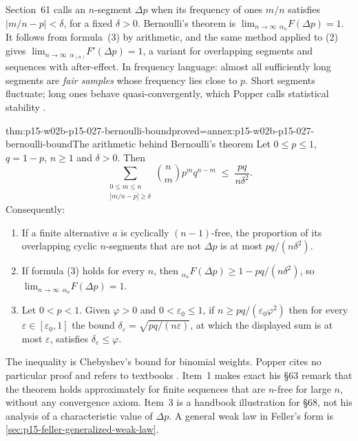 Section~61 calls an \(n\)-segment \(\Delta p\) when its frequency of
ones \(m/n\) satisfies \(|m/n-p|<\delta\), for a fixed \(\delta>0\).
Bernoulli's theorem is
\(\lim_{n\to\infty}{}_{\alpha_n}F(\Delta p)=1\). It follows from
formula~(3) by arithmetic, and the same method applied to (2) gives
\(\lim_{n\to\infty}{}_{\alpha_{(n)}}F'(\Delta p)=1\), a variant for
overlapping segments and sequences with after-effect. In frequency
language: almost all sufficiently long segments are \emph{fair samples}
whose frequency lies close to \(p\). Short segments fluctuate; long ones
behave quasi-convergently, which Popper calls statistical stability
\parencite[\S61]{Popper2002LogicDiscoveryUI}.

\begin{hbtheorem}{thm:p15-w02b-p15-027-bernoulli-bound}{proved=annex:p15-w02b-p15-027-bernoulli-bound}{The arithmetic behind Bernoulli's theorem}
Let \(0\leq p\leq1\), \(q=1-p\), \(n\geq1\) and \(\delta>0\). Then
\[
 \sum_{\substack{0\leq m\leq n\\ |m/n-p|\geq\delta}}\binom{n}{m}p^mq^{n-m}
 \;\leq\;\frac{pq}{n\delta^2}.
\]
Consequently:
\begin{enumerate}
\item If a finite alternative \(a\) is cyclically \((n-1)\)-free, the
  proportion of its overlapping cyclic \(n\)-segments that are not
  \(\Delta p\) is at most \(pq/(n\delta^2)\).
\item If formula (3) holds for every \(n\), then
  \({}_{\alpha_n}F(\Delta p)\geq1-pq/(n\delta^2)\), so
  \(\lim_{n\to\infty}{}_{\alpha_n}F(\Delta p)=1\).
\item Let \(0<p<1\). Given \(\varphi>0\) and \(0<\varepsilon_0\leq1\), if
  \(n\geq pq/(\varepsilon_0\varphi^2)\) then for every
  \(\varepsilon\in[\varepsilon_0,1]\) the bound
  \(\delta_\varepsilon=\sqrt{pq/(n\varepsilon)}\), at which the
  displayed sum is at most \(\varepsilon\), satisfies
  \(\delta_\varepsilon\leq\varphi\).
\end{enumerate}
\end{hbtheorem}

The inequality is Chebyshev's bound for binomial weights. Popper cites
no particular proof and refers to textbooks
\parencite[\S61]{Popper2002LogicDiscoveryUI}. Item~1 makes exact his
\S63 remark that the theorem holds approximately for finite sequences
that are \(n\)-free for large \(n\), without any convergence axiom.
Item~3 is a handbook illustration for \S68, not his analysis of a
characteristic value of \(\Delta p\). A general weak law in Feller's form
is \cref{sec:p15-feller-generalized-weak-law}.

